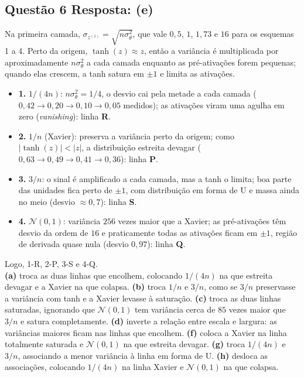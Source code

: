 \documentclass[11pt,a4paper]{article}
\begin{document}
\subsection*{Questão 6 \textemdash{} Resposta: (e)}
Na primeira camada, $\sigma_{z^{(1)}} = \sqrt{n\sigma_\theta^2}$, que vale $0{,}5$, $1$, $1{,}73$ e $16$ para os esquemas 1 a 4. Perto da origem, $\tanh(z) \approx z$, então a variância é multiplicada por aproximadamente $n\sigma_\theta^2$ a cada camada enquanto as pré-ativações forem pequenas; quando elas crescem, a tanh satura em $\pm 1$ e limita as ativações.
\begin{itemize}
    \item \textbf{1.} $1/(4n)$: $n\sigma_\theta^2 = 1/4$, o desvio cai pela metade a cada camada ($0{,}42 \to 0{,}20 \to 0{,}10 \to 0{,}05$ medidos); as ativações viram uma agulha em zero (\textit{vanishing}): linha \textbf{R}.
    \item \textbf{2.} $1/n$ (Xavier): preserva a variância perto da origem; como $|\tanh(z)| < |z|$, a distribuição estreita devagar ($0{,}63 \to 0{,}49 \to 0{,}41 \to 0{,}36$): linha \textbf{P}.
    \item \textbf{3.} $3/n$: o sinal é amplificado a cada camada, mas a tanh o limita; boa parte das unidades fica perto de $\pm 1$, com distribuição em forma de U e massa ainda no meio (desvio $\approx 0{,}7$): linha \textbf{S}.
    \item \textbf{4.} $\mathcal{N}(0, 1)$: variância $256$ vezes maior que a Xavier; as pré-ativações têm desvio da ordem de $16$ e praticamente todas as ativações ficam em $\pm 1$, região de derivada quase nula (desvio $0{,}97$): linha \textbf{Q}.
\end{itemize}
Logo, 1-R, 2-P, 3-S e 4-Q.\\
\textbf{(a)} troca as duas linhas que encolhem, colocando $1/(4n)$ na que estreita devagar e a Xavier na que colapsa.
\textbf{(b)} troca $1/n$ e $3/n$, como se $3/n$ preservasse a variância com tanh e a Xavier levasse à saturação.
\textbf{(c)} troca as duas linhas saturadas, ignorando que $\mathcal{N}(0, 1)$ tem variância cerca de $85$ vezes maior que $3/n$ e satura completamente.
\textbf{(d)} inverte a relação entre escala e largura: as variâncias maiores ficam nas linhas que encolhem.
\textbf{(f)} coloca a Xavier na linha totalmente saturada e $\mathcal{N}(0, 1)$ na que estreita devagar.
\textbf{(g)} troca $1/(4n)$ e $3/n$, associando a menor variância à linha em forma de U.
\textbf{(h)} desloca as associações, colocando $1/(4n)$ na linha Xavier e $\mathcal{N}(0, 1)$ na que colapsa.
\end{document}
